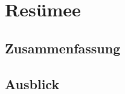 \documentclass[
    fontsize=10pt,    %
    a4paper,      %
    parskip=half-,    %
    twoside,      %
    headings=big,  %
    appendixprefix=true,
    ]{scrreprt}    %
\begin{document}
\cleardoublepage



\part{Resümee}\label{part:resumee}

\chapter{Zusammenfassung}
%

\chapter{Ausblick}
%


\cleardoublepage



\renewcommand{\bibname}{Literatur}
\printbibliography 

\cleardoublepage

\clearpage


\renewcommand{\listfigurename}{Abbildungen}
\listoffigures
\clearpage


{}  %
\renewcommand{\listtablename}{Tabellen}
\listoftables %



\cleardoublepage

\appendix %

 
\end{document}
